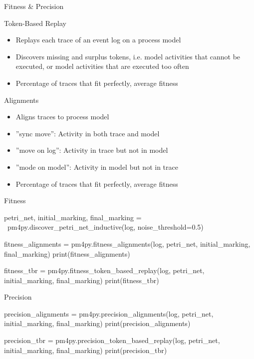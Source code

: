 \documentclass[ignorenonframetext,xcolor=x11names]{beamer}
\begin{document}
\begin{frame}[label=advanced]{Fitness \& Precision}
\begin{block}{Token-Based Replay}
\begin{itemize}
   \item Replays each trace of an event log on a process model
   \item Discovers missing and surplus tokens, i.e. model activities that cannot be executed, or model activities that are executed too often
   \item Percentage of traces that fit perfectly, average fitness
\end{itemize}
\end{block}
\begin{block}{Alignments}
\begin{itemize}
    \item Aligns traces to process model
    \item ''sync move'': Activity in both trace and model
    \item ''move on log'': Activity in trace but not in model
    \item ''mode on model'': Activity in model but not in trace
    \item Percentage of traces that fit perfectly, average fitness
\end{itemize}
\end{block}
\end{frame}

\begin{frame}[label=withcode,fragile]{Fitness}
\footnotesize
\begin{pythoncode}
petri_net, initial_marking, final_marking = \
    pm4py.discover_petri_net_inductive(log, 
        noise_threshold=0.5)

fitness_alignments = pm4py.fitness_alignments(log,
    petri_net, initial_marking, final_marking)
print(fitness_alignments)

fitness_tbr = pm4py.fitness_token_based_replay(log, 
    petri_net, initial_marking, final_marking)
print(fitness_tbr)
\end{pythoncode}
\end{frame}

\begin{frame}[label=withcode,fragile]{Precision}
\footnotesize
\begin{pythoncode}
precision_alignments = pm4py.precision_alignments(log,
    petri_net, initial_marking, final_marking)
print(precision_alignments)

precision_tbr = pm4py.precision_token_based_replay(log, 
    petri_net, initial_marking, final_marking)
print(precision_tbr)
\end{pythoncode}
\end{frame}
\end{document}
